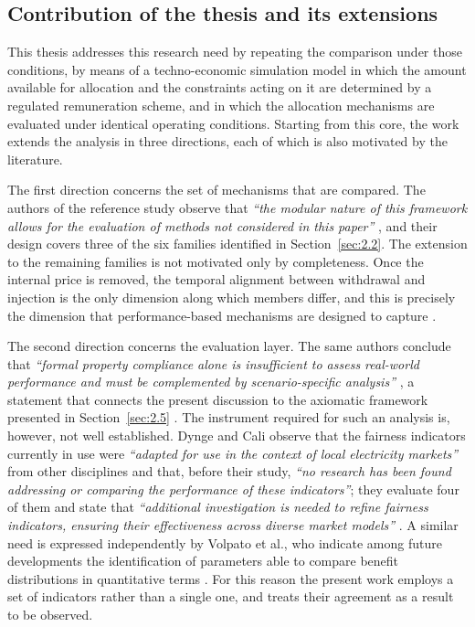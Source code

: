 \subsection*{Contribution of the thesis and its extensions}

This thesis addresses this research need by repeating the comparison under those conditions, by means of a techno-economic simulation model in which the amount available for allocation and the constraints acting on it are determined by a regulated remuneration scheme, and in which the allocation mechanisms are evaluated under identical operating conditions. Starting from this core, the work extends the analysis in three directions, each of which is also motivated by the literature.

The first direction concerns the set of mechanisms that are compared. The authors of the reference study observe that \textit{``the modular nature of this framework allows for the evaluation of methods not considered in this paper''} \cite{gonzalezAsenjo2026}, and their design covers three of the six families identified in Section~\ref{sec:2.2}. The extension to the remaining families is not motivated only by completeness. Once the internal price is removed, the temporal alignment between withdrawal and injection is the only dimension along which members differ, and this is precisely the dimension that performance-based mechanisms are designed to capture \cite{gianaroli2024, giudice2026}.

The second direction concerns the evaluation layer. The same authors conclude that \textit{``formal property compliance alone is insufficient to assess real-world performance and must be complemented by scenario-specific analysis''} \cite{gonzalezAsenjo2026}, a statement that connects the present discussion to the axiomatic framework presented in Section~\ref{sec:2.5} \cite{gonzalezAsenjo2025}. The instrument required for such an analysis is, however, not well established. Dynge and Cali observe that the fairness indicators currently in use were \textit{``adapted for use in the context of local electricity markets''} from other disciplines and that, before their study, \textit{``no research has been found addressing or comparing the performance of these indicators''}; they evaluate four of them and state that \textit{``additional investigation is needed to refine fairness indicators, ensuring their effectiveness across diverse market models''} \cite{dynge2025}. A similar need is expressed independently by Volpato et al., who indicate among future developments the identification of parameters able to compare benefit distributions in quantitative terms \cite{volpato2024}. For this reason the present work employs a set of indicators rather than a single one, and treats their agreement as a result to be observed.


